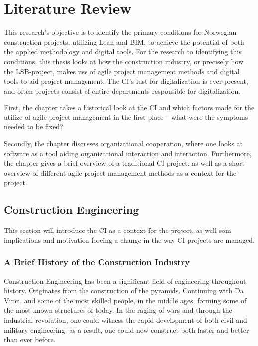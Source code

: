 
\chapter{Literature Review} \label{chp:litterature} 
This research's objective is to identify the primary conditions for Norwegian construction projects, utilizing Lean and BIM, to achieve the potential of both the applied methodology and digital tools. For the research to identifying this conditions, this thesis looks at how the construction industry, or precisely how the LSB-project, makes use of agile project management methods and digital tools to aid project management. The CI's lust for digitalization is ever-present, and often projects consist of entire departments responsible for digitalization.

First, the chapter takes a historical look at the CI and which factors made for the utilize of agile project management in the first place – what were the symptoms needed to be fixed?

Secondly, the chapter discusses organizational cooperation, where one looks at software as a tool aiding organizational interaction and interaction. Furthermore, the chapter gives a brief overview of a traditional CI project, as well as a short overview of different agile project management methods as a context for the project.

\section{Construction Engineering}
This section will introduce the CI as a context for the project, as well som implications and motivation forcing a change in the way CI-projects are managed. 

\subsection{A Brief History of the Construction Industry}
Construction Engineering has been a significant field of engineering throughout history. Originates from the construction of the pyramids. Continuing with Da Vinci, and some of the most skilled people, in the middle ages, forming some of the most known structures of today. In the raging of wars and through the industrial revolution, one could witness the rapid development of both civil and military engineering; as a result, one could now construct both faster and better than ever before.


